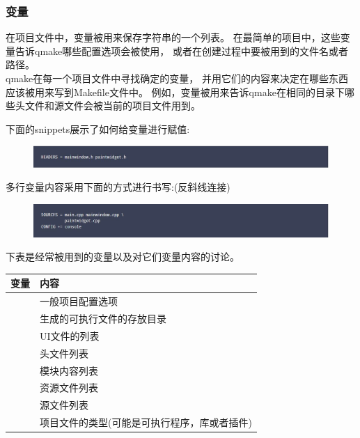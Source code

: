 \subsubsection{变量}
在项目文件中，变量被用来保存字符串的一个列表。%
在最简单的项目中，这些变量告诉qmake哪些配置选项会被使用，%
或者在创建过程中要被用到的文件名或者路径。
\\\newline
qmake在每一个项目文件中寻找确定的变量，%
并用它们的内容来决定在哪些东西应该被用来写到Makefile文件中。%
例如，{\color{seagreen}{HEADERS和SOURCES}}变量被用来告诉qmake在相同的目录下哪些头文件和源文件会被当前的项目文件用到。%
\newline

下面的snippets展示了如何给变量进行赋值:
\begin{figure}[htbp]
  \centering
  \includegraphics[width=\textwidth]{qmake/images/headers}
\end{figure}

多行变量内容采用下面的方式进行书写:(反斜线连接)
\begin{figure}[htbp]
  \centering
  \includegraphics[width=\textwidth]{qmake/images/sources}
\end{figure}

下表是经常被用到的变量以及对它们变量内容的讨论。
\begin{table}[htbp]
  \centering
  \begin{tabular}{|l|l|}\hline
    变量 & 内容 \\\hline
    {\color{seagreen}{CONFIG}} & 一般项目配置选项 \\\hline
    {\color{seagreen}{DESTID}} & 生成的可执行文件的存放目录 \\\hline
    {\color{seagreen}{FORMS}}  & UI文件的列表 \\\hline
    {\color{seagreen}{HEADERS}} & 头文件列表 \\\hline
    {\color{seagreen}{QT}}     & 模块内容列表 \\\hline
    {\color{seagreen}{RESOURCES}} & 资源文件列表 \\\hline
    {\color{seagreen}{SOURCES}} & 源文件列表 \\\hline
    {\color{seagreen}{TEMPLATE}} & 项目文件的类型(可能是可执行程序，库或者插件) \\\hline
  \end{tabular}
\end{table}

